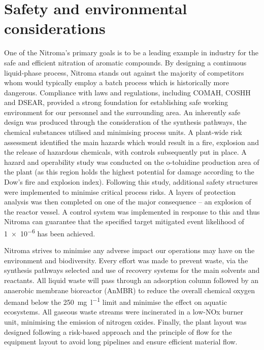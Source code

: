 \section*{Safety and environmental considerations}

 One of the Nitroma's primary goals is to be a leading example in industry for the safe and efficient nitration of aromatic compounds. By designing a continuous liquid-phase process, Nitroma stands out against the majority of competitors whom would typically employ a batch process which is historically more dangerous. Compliance with laws and regulations, including COMAH, COSHH and DSEAR, provided a strong foundation for establishing safe working environment for our personnel and the surrounding area. An inherently safe design was produced through the consideration of the synthesis pathways, the chemical substances utilised and minimising process units. A plant-wide risk assessment identified the main hazards which would result in a fire, explosion and the release of hazardous chemicals, with controls subsequently put in place. A hazard and operability study was conducted on the o-toluidine production area of the plant (as this region holds the highest potential for damage according to the Dow's fire and explosion index). Following this study, additional safety structures were implemented to minimise critical process risks. A layers of protection analysis was then completed on one of the major consequence – an explosion of the reactor vessel. A control system was implemented in response to this and thus Nitroma can guarantee that the specified target mitigated event likelihood of \num{1e-6} has been achieved.

Nitroma strives to minimise any adverse impact our operations may have on the environment and biodiversity. Every effort was made to prevent waste, via the synthesis pathways selected and use of recovery systems for the main solvents and reactants. All liquid waste will pass through an adsorption column followed by an anaerobic membrane bioreactor (AnMBR) to reduce the overall chemical oxygen demand below the \SI{250}{\mg\per\litre} limit and minimise the effect on aquatic ecosystems. All gaseous waste streams were incinerated in a low-NOx burner unit, minimising the emission of nitrogen oxides. Finally, the plant layout was designed following a risk-based approach and the principle of flow for the equipment layout to avoid long pipelines and ensure efficient material flow. 

